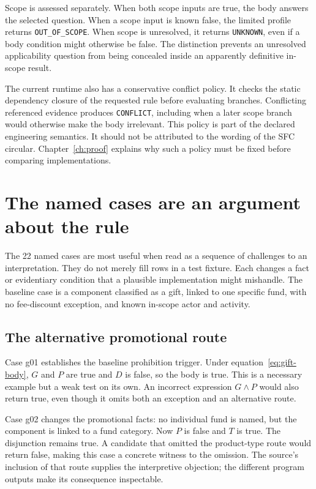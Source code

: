 Scope is assessed separately. When both scope inputs are true, the body answers
the selected question. When a scope input is known false, the limited profile
returns \texttt{OUT\_OF\_SCOPE}. When scope is unresolved, it returns
\texttt{UNKNOWN}, even if a body condition might otherwise be false. The
distinction prevents an unresolved applicability question from being concealed
inside an apparently definitive in-scope result.

The current runtime also has a conservative conflict policy. It checks the
static dependency closure of the requested rule before evaluating branches.
Conflicting referenced evidence produces \texttt{CONFLICT}, including when a
later scope branch would otherwise make the body irrelevant. This policy is
part of the declared engineering semantics. It should not be attributed to the
wording of the SFC circular. Chapter~\ref{ch:proof} explains why such a policy
must be fixed before comparing implementations.

\section{The named cases are an argument about the rule}
\label{sec:circular-cases}
The 22 named cases are most useful when read as a sequence of challenges to an
interpretation. They do not merely fill rows in a test fixture. Each changes a
fact or evidentiary condition that a plausible implementation might mishandle.
The baseline case is a component classified as a gift, linked to one specific
fund, with no fee-discount exception, and known in-scope actor and activity.

\subsection{The alternative promotional route}
Case g01 establishes the baseline prohibition trigger. Under
equation~\eqref{eq:gift-body}, $G$ and $P$ are true and $D$ is false, so the
body is true. This is a necessary example but a weak test on its own. An
incorrect expression $G\land P$ would also return true, even though it omits
both an exception and an alternative route.

Case g02 changes the promotional facts: no individual fund is named, but the
component is linked to a fund category. Now $P$ is false and $T$ is true.
The disjunction remains true. A candidate that omitted the product-type route
would return false, making this case a concrete witness to the omission. The
source's inclusion of that route supplies the interpretive objection; the
different program outputs make its consequence inspectable.

